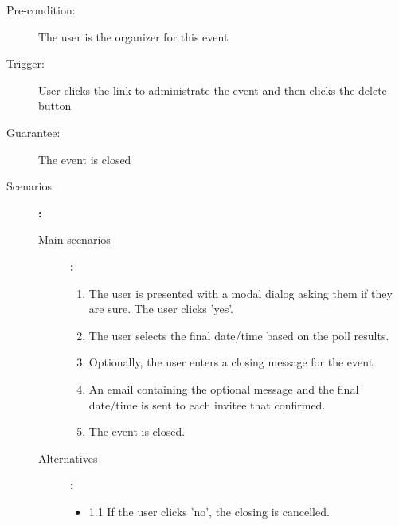 \begin{description}
	\item[Pre-condition:] The user is the organizer for this event
	\item[Trigger:] User clicks the link to administrate the event and then clicks the delete button
	\item[Guarantee:] The event is closed
	\item[Scenarios]\textbf{:}\\
				\begin{description}
					\item[Main scenarios]\textbf{:}\\
								\begin{enumerate}
									\item The user is presented with a modal dialog asking them if they are sure. The user clicks 'yes'.
									\item The user selects the final date/time based on the poll results.
									\item Optionally, the user enters a closing message for the event
									\item An email containing the optional message and the final date/time is sent to each invitee that confirmed.
									\item The event is closed.
								\end{enumerate}
					\item[Alternatives]\textbf{:}\\
								\begin{itemize}
									\item 1.1 If the user clicks 'no', the closing is cancelled.
								\end{itemize}

				\end{description}
\end{description}

